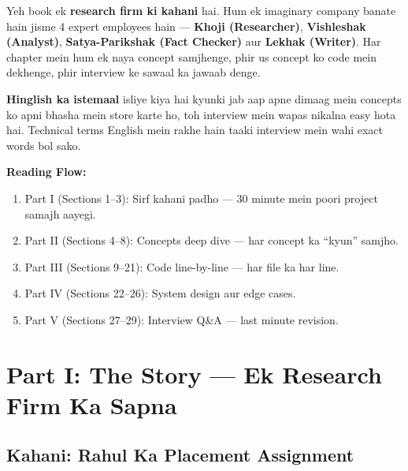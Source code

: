 \documentclass[11pt, a4paper]{article}
\begin{document}
\begin{storybox}
Yeh book ek \textbf{research firm ki kahani} hai. Hum ek imaginary company banate hain jisme 4 expert employees hain --- \textbf{Khoji (Researcher)}, \textbf{Vishleshak (Analyst)}, \textbf{Satya-Parikshak (Fact Checker)} aur \textbf{Lekhak (Writer)}. Har chapter mein hum ek naya concept samjhenge, phir us concept ko code mein dekhenge, phir interview ke sawaal ka jawaab denge.

\textbf{Hinglish ka istemaal} isliye kiya hai kyunki jab aap apne dimaag mein concepts ko apni bhasha mein store karte ho, toh interview mein wapas nikalna easy hota hai. Technical terms English mein rakhe hain taaki interview mein wahi exact words bol sako.

\textbf{Reading Flow:}
\begin{enumerate}[label=\textcolor{accentpurple}{\arabic*.}]
\item Part I (Sections 1--3): Sirf kahani padho --- 30 minute mein poori project samajh aayegi.
\item Part II (Sections 4--8): Concepts deep dive --- har concept ka ``kyun'' samjho.
\item Part III (Sections 9--21): Code line-by-line --- har file ka har line.
\item Part IV (Sections 22--26): System design aur edge cases.
\item Part V (Sections 27--29): Interview Q\&A --- last minute revision.
\end{enumerate}
\end{storybox}

\section{Part I: The Story --- Ek Research Firm Ka Sapna}

\subsection{Kahani: Rahul Ka Placement Assignment}
\end{document}
